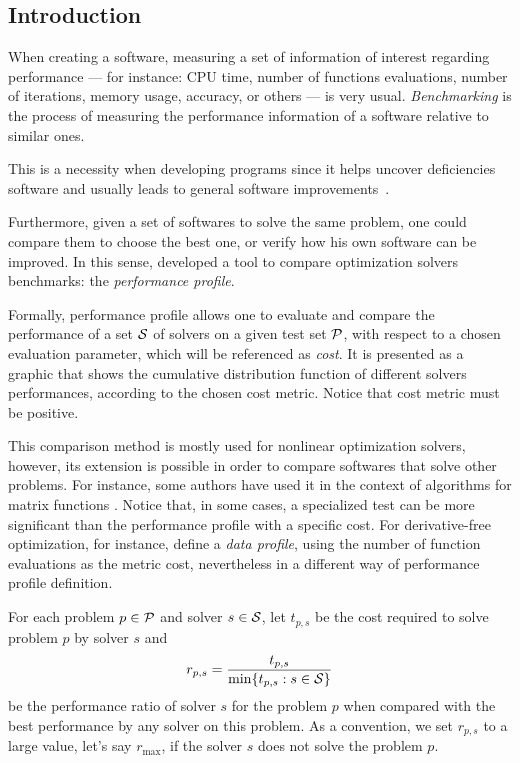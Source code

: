 \subsection*{Introduction}

    When creating a software,  measuring a set of
    information of interest regarding performance
    --- for instance: CPU time, number of
    functions evaluations, number of iterations, memory usage, accuracy, or
    others --- is very usual.   \emph{Benchmarking} is the process of measuring
    the performance  information of a software relative to similar ones.
    
    This is a necessity when developing programs since it
    helps uncover deficiencies software and usually leads
    to general software improvements~\cite
    {url:mittelmann,Mittelmann:1999fb,Dolan:2006kl}.

    Furthermore, given a set of softwares to solve the same problem, one could
    compare them to choose the best one, or verify how his own software can be
    improved. In this sense, \textcite{Dolan:2002du} developed a tool to 
    compare optimization solvers benchmarks: the \emph{performance profile}.

    Formally,  performance profile allows one to evaluate and compare the
    performance
    of a set $\mathcal{S}$ of solvers  on a given test set $\mathcal{P}$, with respect
    to a chosen evaluation parameter,
    which will be referenced as \emph{cost}.
    It is presented as
    a graphic that shows the cumulative distribution function of different
    solvers performances, according to the chosen cost metric.
    Notice that cost metric must be positive.

    This comparison method is mostly used for nonlinear optimization solvers,
    however, its extension is possible in order to compare
    softwares that solve other problems.
    For instance, some authors have used it in the context of algorithms for
    matrix functions \cite{al-mohy:2009, al-mohy:2011, al-mohy:2012,
    higham:2005, higham:2009, higham:2011, higham:2013}.
    Notice that, in some cases, a
    specialized test can be more significant than the performance profile with
    a specific cost.  For derivative-free optimization, for instance,
    \textcite{More:2009benchmarking} define a \emph{data profile}, using the
    number of function evaluations as the metric cost, nevertheless in a 
    different way of performance profile definition.

    For each
    problem $p \in \mathcal{P}$ and solver $s \in \mathcal{S}$, let $t_{p,s}$ be the
    cost required to solve problem $p$ by solver $s$ and
    \begin{align*}
      r_{p,s} = \frac{t_{p,s}}{\min\{t_{p,s}: s \in \mathcal{S}\}}
    \end{align*}
    be the performance ratio of solver $s$ for the problem $p$ when compared
    with the best performance by any solver on this problem.
    As a convention, we set $r_{p,s}$ to a large value, let's say $r_{\max}$, if
    the solver $s$ does not solve the problem $p$.

